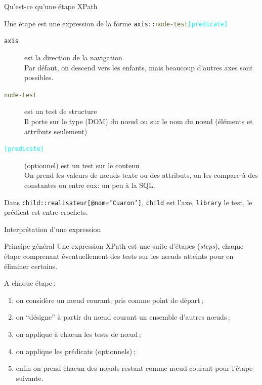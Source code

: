 \begin{frame}{Qu'est-ce qu'une \alert{étape} XPath}

Une \alert{étape}  est une expression de la forme 
\texttt{\textcolor{indiaRed}{axis}::\textcolor{DarkOliveGreen}{node-test}\textcolor{cyan}{[predicate]}
}\\


\begin{description}
\item[\texttt{\textcolor{indiaRed}{axis}}] est la direction de la navigation\\

   Par défaut, on descend vers les enfants, mais beaucoup d'autres axes sont possibles.
   
\item[\texttt{\textcolor{DarkOliveGreen}{node-test}}] est  un test de structure\\

   Il porte sur le type (DOM) du nœud ou sur le nom du nœud (éléments et attributs seulement)
   
\item[\texttt{\textcolor{cyan}{[predicate]}}] (optionnel) est un test sur le contenu\\

    On prend les valeurs de nœuds-texte ou des attributs, on les compare à des constantes ou entre eux:
    un peu à la SQL.
    
\end{description}

\medskip

Dans \texttt{child::realisateur[@nom='Cuaron']}, 
\texttt{child} est l'axe, \texttt{library} le test,  le prédicat est entre crochets. 

\end{frame}


\begin{frame}{Interprétation d'une expression}

\begin{block}{Principe général}
Une expression XPath est une suite d'étapes (\textit{steps}), chaque étape comprenant éventuellement des tests 
sur les nœuds atteints pour en éliminer certains.
\end{block}

\medskip
A chaque étape\,:
\begin{enumerate}
  \item on considère un \alert{nœud courant}, pris comme point de départ\,;
   \item on ``désigne'' à partir du nœud courant un ensemble d'autres nœuds\,;
   \item on applique à chacun les tests de nœud\,;
   \item on applique les prédicats (optionnels)\,;
   \item enfin on prend chacun des nœuds restant comme nœud courant pour l'étape suivante.
\end{enumerate}
\end{frame}


